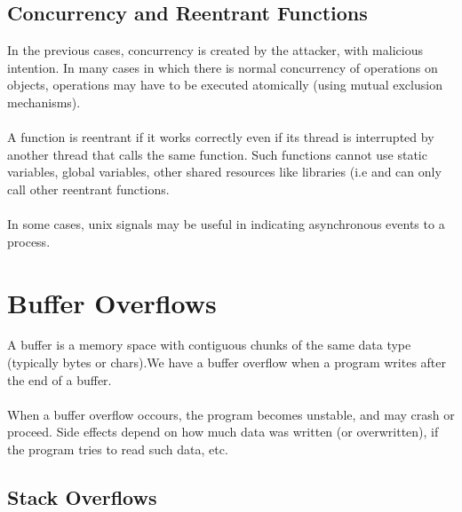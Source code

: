\documentclass[10pt,a4paper]{report}
\begin{document}
\subsection{Concurrency and Reentrant Functions}
In the previous cases, concurrency is created by the attacker, with malicious intention. In many cases in which there is normal concurrency of operations on objects, operations may have to be executed atomically (using mutual exclusion mechanisms).\\
\\
A function is reentrant if it works correctly even if its thread is interrupted by another thread that calls the same function. Such functions cannot use static variables, global variables, other shared resources like libraries (i.e and can only call other reentrant functions.\\
\\
In some cases, unix signals may be useful in indicating asynchronous events to a process.

\section{Buffer Overflows}
A buffer is a memory space with contiguous chunks of the same data type (typically bytes or chars).We have a buffer overflow when a program writes after the end of a buffer.\\
\\
When a buffer overflow occours, the program becomes unstable, and may crash or proceed. Side effects depend on how much data was written (or overwritten), if the program tries to read such data, etc.
\subsection{Stack Overflows}
\end{document}
